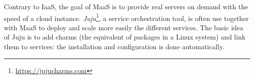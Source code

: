 Contrary to IaaS, the goal of MaaS is to provide real servers on demand with the speed of a cloud instance. \textit{Juju}\footnote{\url{https://jujucharms.com}}, a service orchestration tool, is often use together with MaaS to deploy and scale more easily the different services. The basic idea of Juju is to add charms (the equivalent of packages in a Linux system) and link them to services: the installation and configuration is done automatically.







